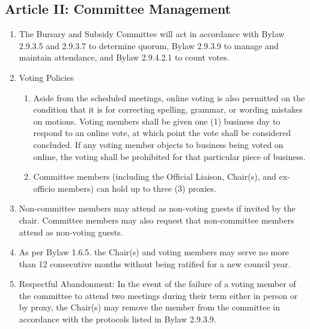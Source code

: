 \subsection{Article II: Committee Management}
\begin{enumerate}[label*=\arabic*., align=left]	
\item The Bursary and Subsidy Committee will act in accordance with Bylaw 2.9.3.5 and 2.9.3.7 to determine quorum, Bylaw 2.9.3.9 to manage and maintain attendance, and Bylaw 2.9.4.2.1 to count votes.
\item Voting Policies
\begin{enumerate}[label*=\arabic*., align=left]	
\item Aside from the scheduled meetings, online voting is also permitted on the condition that it is for correcting spelling, grammar, or wording mistakes on motions. Voting members shall be given one (1) business day to respond to an online vote, at which point the vote shall be considered concluded. If any voting member objects to business being voted on online, the voting shall be prohibited for that particular piece of business.
\item Committee members (including the Official Liaison, Chair(s), and ex-officio members) can hold up to three (3) proxies.
\end{enumerate}
\item Non-committee members may attend as non-voting guests if invited by the chair. Committee members may also request that non-committee members attend as non-voting guests.
\item As per Bylaw 1.6.5. the Chair(s) and voting members may serve no more than 12 consecutive months without being ratified for a new council year.
\item Respectful Abandonment: In the event of the failure of a voting member of the committee to attend two meetings during their term either in person or by proxy, the Chair(s) may remove the member from the committee in accordance with the protocols listed in Bylaw 2.9.3.9.
\end{enumerate}

